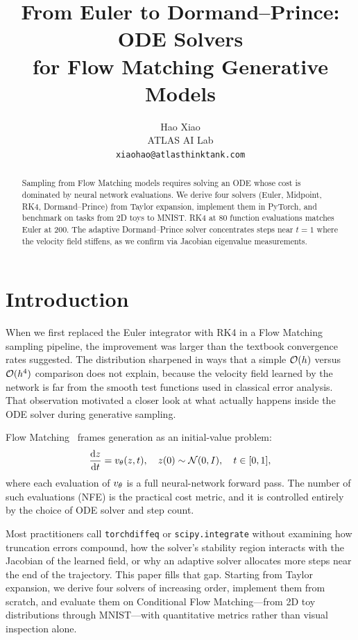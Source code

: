 \documentclass[11pt]{article}
\title{From Euler to Dormand--Prince: ODE Solvers\\for Flow Matching Generative Models}
\author{
  Hao Xiao \\
  ATLAS AI Lab \\
  \texttt{xiaohao@atlasthinktank.com}
}
\begin{document}
\maketitle

\begin{abstract}
Sampling from Flow Matching models requires solving an ODE whose cost
is dominated by neural network evaluations.  We derive four solvers
(Euler, Midpoint, RK4, Dormand--Prince) from Taylor expansion,
implement them in PyTorch, and benchmark on tasks from 2D toys to
MNIST.  RK4 at 80 function evaluations matches Euler at 200.  The
adaptive Dormand--Prince solver concentrates steps near $t{=}1$ where
the velocity field stiffens, as we confirm via Jacobian eigenvalue
measurements.
\end{abstract}

\section{Introduction}
\label{sec:intro}

When we first replaced the Euler integrator with RK4 in a Flow
Matching sampling pipeline, the improvement was larger than the
textbook convergence rates suggested. The distribution sharpened
in ways that a simple $\mathcal{O}(h)$ versus $\mathcal{O}(h^4)$ comparison
does not explain, because the velocity field learned by the network
is far from the smooth test functions used in classical error
analysis.  That observation motivated a closer look at what
actually happens inside the ODE solver during generative sampling.

Flow Matching~\citep{lipman2023flow,liu2023flow} frames generation
as an initial-value problem:
\begin{equation}
\label{eq:sampling-ode}
\frac{\mathrm{d}z}{\mathrm{d}t} = v_\theta(z,t),\quad z(0)\sim\mathcal{N}(0,I),\quad t\in[0,1],
\end{equation}
where each evaluation of $v_\theta$ is a full neural-network forward
pass.  The number of such evaluations (NFE) is the practical cost
metric, and it is controlled entirely by the choice of ODE solver
and step count.

Most practitioners call \texttt{torchdiffeq} or
\texttt{scipy.integrate} without examining how truncation errors
compound, how the solver's stability region interacts with the
Jacobian of the learned field, or why an adaptive solver
allocates more steps near the end of the trajectory.  This paper
fills that gap.  Starting from Taylor expansion, we derive four
solvers of increasing order, implement them from scratch, and
evaluate them on Conditional Flow Matching---from 2D toy
distributions through MNIST---with quantitative metrics rather
than visual inspection alone.
\end{document}
